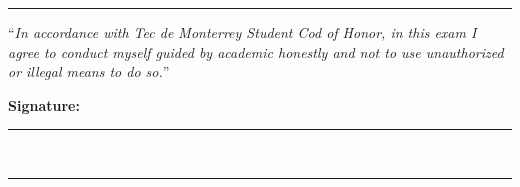 \rule{18.2cm}{0.6mm}
\vspace{-0.25cm}
``\textit{In accordance with Tec de Monterrey Student Cod of Honor, in this exam I agree to conduct myself guided by academic honestly and not to use unauthorized or illegal means to do so.}''
\begin{flushright}
        \textbf{Signature:}\;\rule{3cm}{0.1mm}\\
\end{flushright}
\rule{18.2cm}{0.6mm}